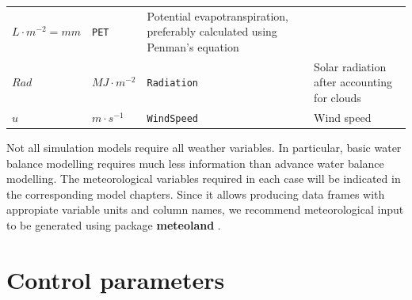 \documentclass[]{book}
\begin{document}
\begin{longtable}[]{@{}llll@{}}
\begin{minipage}[t]{0.10\columnwidth}
\(L \cdot m^{-2} = mm\)\strut
\end{minipage} & \begin{minipage}[t]{0.12\columnwidth}\raggedright\strut
\texttt{PET}\strut
\end{minipage} & \begin{minipage}[t]{0.45\columnwidth}\raggedright\strut
Potential evapotranspiration, preferably calculated using Penman's
equation\strut
\end{minipage}\tabularnewline
\begin{minipage}[t]{0.11\columnwidth}\raggedright\strut
\(Rad\)\strut
\end{minipage} & \begin{minipage}[t]{0.10\columnwidth}\raggedright\strut
\(MJ \cdot m^{-2}\)\strut
\end{minipage} & \begin{minipage}[t]{0.12\columnwidth}\raggedright\strut
\texttt{Radiation}\strut
\end{minipage} & \begin{minipage}[t]{0.45\columnwidth}\raggedright\strut
Solar radiation after accounting for clouds\strut
\end{minipage}\tabularnewline
\begin{minipage}[t]{0.11\columnwidth}\raggedright\strut
\(u\)\strut
\end{minipage} & \begin{minipage}[t]{0.10\columnwidth}\raggedright\strut
\(m \cdot s^{-1}\)\strut
\end{minipage} & \begin{minipage}[t]{0.12\columnwidth}\raggedright\strut
\texttt{WindSpeed}\strut
\end{minipage} & \begin{minipage}[t]{0.45\columnwidth}\raggedright\strut
Wind speed\strut
\end{minipage}\tabularnewline
\bottomrule
\end{longtable}

Not all simulation models require all weather variables. In particular,
basic water balance modelling requires much less information than
advance water balance modelling. The meteorological variables required
in each case will be indicated in the corresponding model chapters.
Since it allows producing data frames with appropiate variable units and
column names, we recommend meteorological input to be generated using
package \textbf{meteoland} \citep{DeCaceres2018}.

\section{Control parameters}\label{control-parameters}
\end{document}
